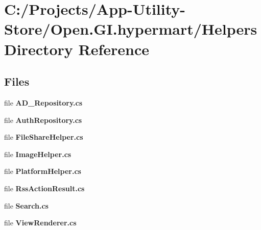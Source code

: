 \section{C\+:/\+Projects/\+App-\/\+Utility-\/\+Store/\+Open.G\+I.\+hypermart/\+Helpers Directory Reference}
\label{dir_9a5781a39eb9bc4c22df25ae7820a438}
\subsection*{Files}
\begin{DoxyCompactItemize}
\item 
file \textbf{ A\+D\+\_\+\+Repository.\+cs}
\item 
file \textbf{ Auth\+Repository.\+cs}
\item 
file \textbf{ File\+Share\+Helper.\+cs}
\item 
file \textbf{ Image\+Helper.\+cs}
\item 
file \textbf{ Platform\+Helper.\+cs}
\item 
file \textbf{ Rss\+Action\+Result.\+cs}
\item 
file \textbf{ Search.\+cs}
\item 
file \textbf{ View\+Renderer.\+cs}
\end{DoxyCompactItemize}
